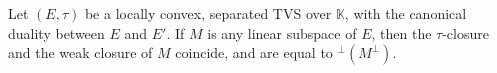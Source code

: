 Let $(E, \tau)$ be a locally convex, separated TVS over $\mathbb{K}$, with the canonical duality between $E$ and $E'$. If $M$ is any linear subspace of $E$, then the $\tau$-closure and the weak closure of $M$ coincide, and are equal to ${}^\perp(M^\perp)$.
